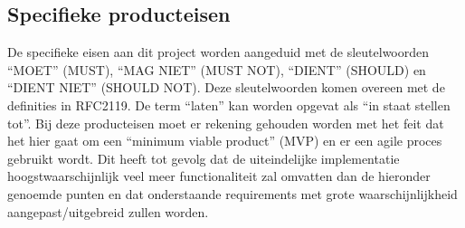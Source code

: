 \subsection{Specifieke producteisen}
De specifieke eisen aan dit project worden aangeduid met de sleutelwoorden “MOET” (MUST), “MAG NIET” (MUST NOT), “DIENT” (SHOULD) en “DIENT NIET” (SHOULD NOT). Deze sleutelwoorden komen overeen met de definities in RFC2119. De term “laten” kan worden opgevat als “in staat stellen tot”. Bij deze producteisen moet er rekening gehouden worden met het feit dat het hier gaat om een “minimum viable product” (MVP) en er een agile proces gebruikt wordt. Dit heeft tot gevolg dat de uiteindelijke implementatie hoogstwaarschijnlijk veel meer functionaliteit zal omvatten dan de hieronder genoemde punten en dat onderstaande requirements met grote waarschijnlijkheid aangepast/uitgebreid zullen worden.

